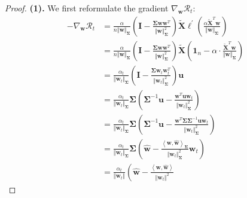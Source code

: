 \documentclass[pdflatex,sn-basic]{sn-jnl}%
\theoremstyle{thmstyleone}%
\begin{document}
\begin{appendices}
\pagebreak
\begin{proof}
  \noindent \textbf{(1).}
  We first reformulate the gradient $\nabla_\mathbf{w} \mathcal{R}_t$:
  \begin{equation*}
  \begin{aligned}
    - \nabla_\mathbf{w} \mathcal{R}_t
    & =
    \frac{\alpha}{n \Vert \mathbf{w} \Vert_{\mathbf{\Sigma}}}
    \left(
      \mathbf{I} - \frac{\mathbf{\Sigma} \mathbf{w} \mathbf{w}^{T}}{\Vert \mathbf{w} \Vert_{\mathbf{\Sigma}}^{2}}
    \right)
    \tilde{\mathbf{X}} 
    \boldsymbol{\ell^\prime}\left(
      \frac{
      \alpha \tilde{\mathbf{X}}^T \mathbf{w}
      }{\Vert \mathbf{w} \Vert_\mathbf{\Sigma}}
    \right)
    \\ & =
    \frac{\alpha}{n \Vert \mathbf{w} \Vert_{\mathbf{\Sigma}}}
    \left(
      \mathbf{I} - \frac{\mathbf{\Sigma} \mathbf{w} \mathbf{w}^{T}}{\Vert \mathbf{w} \Vert_{\mathbf{\Sigma}}^{2}}
    \right)
    \tilde{\mathbf{X}} 
    \left(
      \mathbf{1}_{n}
      -
      \alpha \cdot
      \frac{
       \tilde{\mathbf{X}}^T \mathbf{w}
      }{\Vert \mathbf{w} \Vert_\mathbf{\Sigma}}
    \right)
    \\ & =
    \frac{\alpha_t}{\Vert \mathbf{w}_{t} \Vert_{\mathbf{\Sigma}}}
    \left(
      \mathbf{I} - \frac{\mathbf{\Sigma} \mathbf{w}_{t} \mathbf{w}_{t}^{T}}{\Vert \mathbf{w}_{t} \Vert_{\mathbf{\Sigma}}^{2}}
    \right)
    \mathbf{u}
    \\ & = 
    \frac{\alpha_t}{\Vert \mathbf{w}_{t} \Vert_{\mathbf{\Sigma}}}
    \mathbf{\Sigma}
    \left(
      \mathbf{\Sigma}^{-1} \mathbf{u} - \frac{\mathbf{w}^{T} \mathbf{u} \mathbf{w}_{t}}{\Vert \mathbf{w}_{t} \Vert_{\mathbf{\Sigma}}^{2}}
    \right)
    \\ & = 
    \frac{\alpha_t}{\Vert \mathbf{w}_{t} \Vert_{\mathbf{\Sigma}}}
    \mathbf{\Sigma}
    \left(
      \mathbf{\Sigma}^{-1} \mathbf{u} - \frac{\mathbf{w}^{T} \mathbf{\Sigma} \mathbf{\Sigma}^{-1} \mathbf{u} \mathbf{w}_{t}}{\Vert \mathbf{w}_{t} \Vert_{\mathbf{\Sigma}}^{2}}
    \right)
    \\ & = 
    \frac{\alpha_t}{\Vert \mathbf{w}_{t} \Vert_{\mathbf{\Sigma}}}
    \mathbf{\Sigma}
    \left(
      \hat{\mathbf{w}} - \frac{\left\langle \mathbf{w}, \hat{\mathbf{w}}\right\rangle_\mathbf{\Sigma} }{\Vert \mathbf{w}_{t} \Vert_{\mathbf{\Sigma}}^{2}}
      \mathbf{w}_{t}
    \right)
    \\ & = 
    \frac{\alpha_t}{\Vert \mathbf{w}_{t} \Vert}
    \left(
      \hat{\mathbf{w}} - \frac{\left\langle \mathbf{w}, \hat{\mathbf{w}}\right\rangle }{\Vert \mathbf{w}_{t} \Vert^{2}}

\end{aligned}
\end{equation*}
\end{proof}
\end{appendices}
\end{document}
